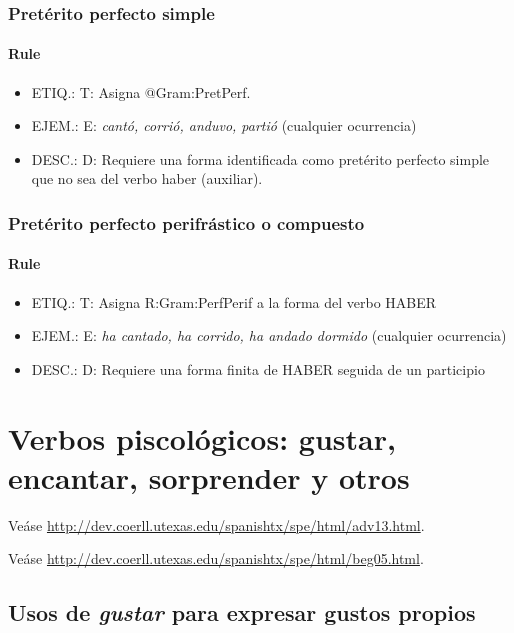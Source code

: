 \documentclass[11pt]{report}
\begin{document}
\subsubsection{Pretérito perfecto simple}
\paragraph*{Rule}
\begin{itemize}
\item ETIQ.:  T: Asigna @Gram:PretPerf.
\item EJEM.:  E: \emph{cantó, corrió, anduvo, partió} (cualquier ocurrencia)
\item DESC.:  D: Requiere una forma identificada como pretérito perfecto simple que no sea del verbo haber (auxiliar).
\end{itemize}

\subsubsection{Pretérito perfecto perifrástico o compuesto}\label{sec:HaberAuxPretPerfecto}
\paragraph*{Rule}
\begin{itemize}
\item ETIQ.:  T: Asigna R:Gram:PerfPerif a la forma del verbo HABER
\item EJEM.:  E: \emph{ha cantado, ha corrido, ha andado dormido} (cualquier ocurrencia)
\item DESC.:  D: Requiere una forma finita de HABER seguida de un participio
\end{itemize}

\section{Verbos piscológicos: gustar, encantar, sorprender y otros}
Veáse \url{http://dev.coerll.utexas.edu/spanishtx/spe/html/adv13.html}.

Veáse \url{http://dev.coerll.utexas.edu/spanishtx/spe/html/beg05.html}.

\subsection{Usos de \emph{gustar} para expresar gustos propios}
\end{document}
